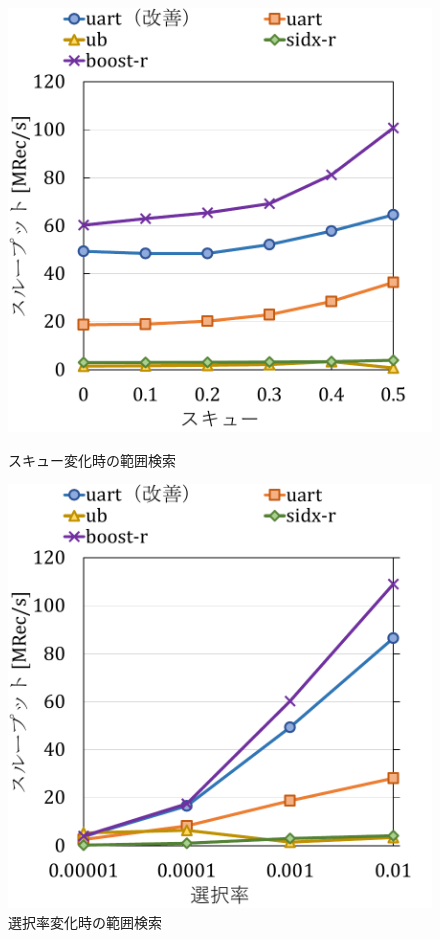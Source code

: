 \begin{figure}[tb]
  \begin{minipage}[c]{0.495\textwidth}
    \centering
    \includegraphics[scale=0.5]{./figures/graph-scan-skew.pdf}
    \caption{スキュー変化時の範囲検索}
    \label{fig:japan}
  \end{minipage}
  \begin{minipage}[c]{0.495\textwidth}
    \centering
    \includegraphics[scale=0.5]{./figures/graph-scan-selectivity.pdf}
    \caption{選択率変化時の範囲検索}
    \label{fig:japan}
  \end{minipage}
\end{figure}

